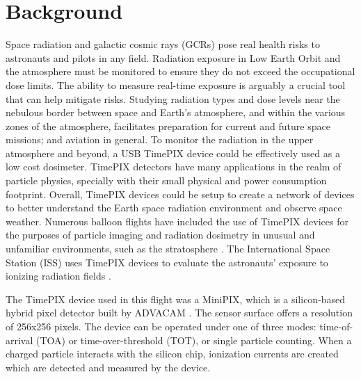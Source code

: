 %
%
%
\section{Background}
\label{Background}
Space radiation and galactic cosmic rays (GCRs) pose real health risks to astronauts and pilots in any field.  Radiation exposure in Low Earth Orbit and the atmosphere must be monitored to ensure they do not exceed the occupational dose limits.  The ability to measure real-time exposure is arguably a crucial tool that can help mitigate risks.  Studying radiation types and dose levels near the nebulous border between space and Earth's atmosphere, and within the various zones of the atmosphere, facilitates preparation for current and future space missions; and aviation in general.  
To monitor the radiation in the upper atmosphere and beyond, a USB TimePIX device could be effectively used as a low cost dosimeter.  TimePIX detectors have many applications in the realm of particle physics, specially with their small physical and power consumption footprint. Overall, TimePIX devices could be setup to create a network of devices to better understand the Earth space radiation environment and observe space weather.
%
%
%
%
Numerous balloon flights have included the use of TimePIX devices for the purposes of particle imaging and radiation dosimetry in unusual and unfamiliar environments, such as the stratosphere \cite{bexus}. 
%
The International Space Station (ISS) uses TimePIX devices to evaluate the astronauts' exposure to ionizing radiation fields \cite{timepix}.

The TimePIX device used in this flight was a MiniPIX, which is a silicon-based hybrid pixel detector built by ADVACAM \cite{advacam}. 
%
The sensor surface offers a resolution of 256x256 pixels.
%
The device can be operated under one of three modes: time-of-arrival (TOA) or time-over-threshold (TOT), or single particle counting. 
%
When a charged particle interacts with the silicon chip, ionization currents are created which are detected and measured by the device.

